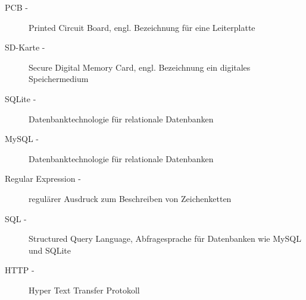 \begin{description}
                \item[PCB -] Printed Circuit Board, engl. Bezeichnung für eine Leiterplatte
                \item[SD-Karte -] Secure Digital Memory Card, engl. Bezeichnung ein digitales Speichermedium
                \item[SQLite -] Datenbanktechnologie für relationale Datenbanken
                \item[MySQL -] Datenbanktechnologie für relationale Datenbanken
                \item[Regular Expression -] regulärer Ausdruck zum Beschreiben von Zeichenketten
                \item[SQL -] Structured Query Language, Abfragesprache für Datenbanken wie MySQL und SQLite
                \item[HTTP -] Hyper Text Transfer Protokoll
			\end{description}